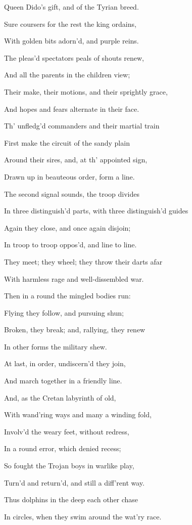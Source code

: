 Queen Dido’s gift, and of the Tyrian breed.

Sure coursers for the rest the king ordains,

With golden bits adorn’d, and purple reins.

The pleas’d spectators peals of shouts renew,

And all the parents in the children view;

Their make, their motions, and their sprightly grace,

And hopes and fears alternate in their face.

Th’ unfledg’d commanders and their martial train

First make the circuit of the sandy plain

Around their sires, and, at th’ appointed sign,

Drawn up in beauteous order, form a line.

The second signal sounds, the troop divides

In three distinguish’d parts, with three distinguish’d guides

Again they close, and once again disjoin;

In troop to troop oppos’d, and line to line.

They meet; they wheel; they throw their darts afar

With harmless rage and well-dissembled war.

Then in a round the mingled bodies run:

Flying they follow, and pursuing shun;

Broken, they break; and, rallying, they renew

In other forms the military shew.

At last, in order, undiscern’d they join,

And march together in a friendly line.

And, as the Cretan labyrinth of old,

With wand’ring ways and many a winding fold,

Involv’d the weary feet, without redress,

In a round error, which denied recess;

So fought the Trojan boys in warlike play,

Turn’d and return’d, and still a diff’rent way.

Thus dolphins in the deep each other chase

In circles, when they swim around the wat’ry race.

